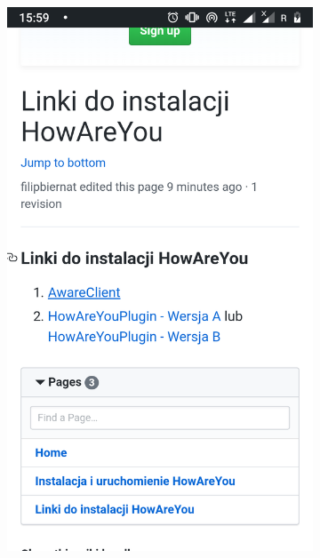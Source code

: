 \begin{enumerate}
	\clearpage 
	\begin{figure}[H]
		\centering
		\begin{subfigure}{0.35\textwidth}
			\centering
			\includegraphics[scale=0.13]{dodatekA/2_1.png}
			\subcaption{\label{subfigure_a}}
		\end{subfigure}
		\begin{subfigure}{0.35\textwidth}
			\centering

\end{subfigure}
\end{figure}
\end{enumerate}
